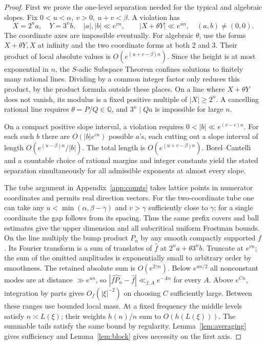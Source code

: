 \documentclass[11pt,a4paper,reqno]{amsart}
\theoremstyle{definition}
\theoremstyle{remark}
\numberwithin{equation}{section}
\begin{document}
\begin{proof}
First we prove the one-level separation needed for the typical and
algebraic slopes. Fix \(0<u<\alpha,\ v>0,\ u+v<\beta\).
A violation has
\[
 X=2^na,\quad Y=3^nb,\quad |a|,|b|\ll e^{vn},\qquad
                 |X+\theta Y|\ll e^{un},\quad(a,b)\ne(0,0).
\]
The coordinate axes are impossible eventually. For algebraic
\(\theta\), use the forms \(X+\theta Y,X\) at infinity and the two
coordinate forms at both 2 and 3. Their product of local absolute
values is \(O(e^{(u+v-\beta)n})\). Since the height is at most
exponential in \(n\), the \(S\)-adic Subspace Theorem
\cite{Schlickewei} confines solutions to finitely many rational
lines. Dividing by a common integer factor only reduces this product,
by the product formula outside these places. On a line where
\(X+\theta Y\) does not vanish, its modulus is a fixed positive
multiple of \(|X|\ge2^n\). A cancelling rational line requires
\(\theta=P/Q\in\mathbb Q\), and \(3^n\mid Qa\) is impossible for
large \(n\).

On a compact positive slope interval, a violation requires
\(0<|b|\ll e^{(v-c)n}\). For each such \(b\) there are
\(O(|b|e^{cn})\) possible \(a\)'s, each cutting out a slope
interval of length \(O(e^{(u-\beta)n}/|b|)\). The total length
is \(O(e^{(u+v-\beta)n})\). Borel--Cantelli and a countable choice
of rational margins and integer constants yield the stated
separation simultaneously for all admissible exponents at almost
every slope.

The tube argument in Appendix~\ref{app:counts} takes lattice points
in numerator coordinates and permits real direction vectors.
For the two-coordinate tube one can take any
\(u<\min(\alpha,\beta-\gamma)\) and \(v>\gamma\) sufficiently close
to \(\gamma\); for a single coordinate the gap follows from its
spacing. Thus the same prefix covers and ball estimates give the
upper dimension and all subcritical uniform Frostman bounds. On
the line multiply the bump product \(P_n\) by any smooth compactly
supported \(f\). Its Fourier transform is a sum of translates of
\(\widehat f\) at \(2^na+\theta3^nb\). Truncate at \(e^{vn}\);
the sum of the omitted amplitudes is exponentially small to
arbitrary order by smoothness. The retained absolute sum is
\(O(e^{2\gamma n})\). Below \(e^{un/2}\) all nonconstant modes
are at distance \(\gg e^{un}\), so
\(|\widehat{fP_n}-\widehat f|\ll_{f,A} e^{-An}\) for every \(A\).
Above \(e^{C n}\), integration by parts gives \(O_f(|\xi|^{-2})\)
on choosing \(C\) sufficiently large. Between these ranges use
bounded local mass. At a fixed frequency the middle levels satisfy
\(n\asymp L(\xi)\); their weights \(h(n)/n\) sum to \(O(h(L(\xi)))\).
The summable tails satisfy the same bound by regularity.
Lemma~\ref{lem:averaging} gives sufficiency and Lemma~\ref{lem:block}
gives necessity on the first axis.


\end{proof}
\end{document}
